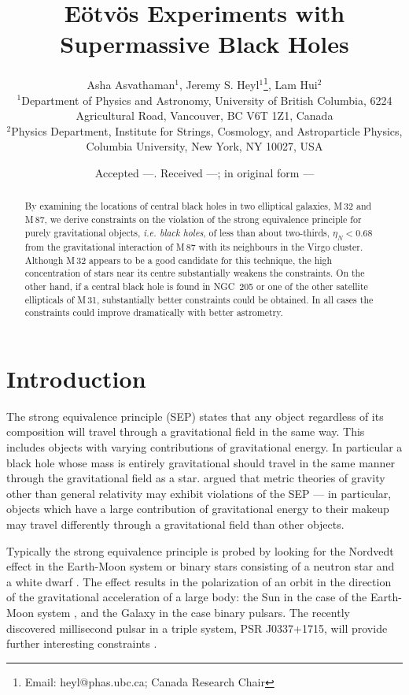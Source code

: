 \documentclass[useAMS,usenatbib]{mn2e}
\title[E\"otv\"os Experiments]{E\"otv\"os Experiments with 
  Supermassive Black Holes  }
\author[Asvathaman, Heyl \& Hui]{Asha Asvathaman$^{1}$, Jeremy S. Heyl$^{1}$\thanks{Email:
    heyl@phas.ubc.ca; Canada Research Chair}, Lam Hui$^{2}$ \\
$^{1}$Department of Physics and Astronomy, University of British
  Columbia, 6224 Agricultural Road, Vancouver, BC V6T 1Z1, Canada\\
  $^{2}$Physics Department, Institute for Strings, Cosmology, and Astroparticle Physics, Columbia University, New York, NY 10027, USA}
\begin{document}
\date{Accepted ---. Received ---; in original form ---}

\pagerange{\pageref{firstpage}--\pageref{lastpage}} 

\maketitle

\label{firstpage}

\begin{abstract}
  By examining the locations of central black holes in two elliptical
  galaxies, M\,32 and M\,87, we derive constraints on the violation of
  the strong equivalence principle for purely gravitational objects,
  {\em i.e. black holes}, of less than about two-thirds, $\eta_N<0.68$
  from the gravitational interaction of M\,87 with its neighbours in
  the Virgo cluster.  Although M\,32 appears to be a good candidate
  for this technique, the high concentration of stars near its centre
  substantially weakens the constraints.  On the other hand, if a
  central black hole is found in NGC~205 or one of the other satellite
  ellipticals of M\,31, substantially better constraints could be
  obtained. In all cases the constraints could improve dramatically
  with better astrometry.
\end{abstract}

\section{Introduction}

The strong equivalence principle (SEP) states that any object
regardless of its composition will travel through a gravitational
field in the same way.  This includes objects with varying
contributions of gravitational energy.  In particular a black hole
whose mass is entirely gravitational should travel in the same manner
through the gravitational field as a
star. \citet{1968PhRv..169.1014N,1968PhRv..169.1017N} argued that
metric theories of gravity other than general relativity may exhibit
violations of the SEP --- in particular,
objects 
which
have a large contribution of gravitational energy to
their makeup may travel differently through a gravitational field than
other objects.

Typically the strong equivalence principle is probed by looking for
the Nordvedt effect in the Earth-Moon system or binary stars
consisting of a neutron star and a white dwarf \citep{Stairs:2005}.
The \citet{1968PhRv..170.1186N} effect results in the polarization of
an orbit in the direction of the gravitational acceleration of a large
body: the Sun in the case of the Earth-Moon system
\citep{1976PhRvL..36..551W,1976PhRvL..36..555S}, and the Galaxy in the
case binary pulsars.  The recently discovered millisecond pulsar in a
triple system, PSR J0337+1715, will provide further interesting
constraints \citep{Ransom:2014aa}.
\end{document}
